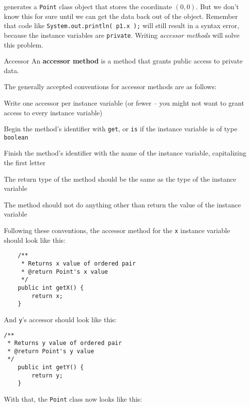 generates a \texttt{Point} class object that stores the coordinate $(0,0)$.  But we don't know this for sure until we can get the data back out of the object.  Remember that code like \texttt{System.out.println( p1.x );} will still result in a syntax error, because the instance variables are \texttt{private}.  Writing \textit{accessor methods} will solve this problem.

\begin{defn}{Accessor}
    An \textbf{accessor method} is a method that grants public access to private data.
\end{defn}

The generally accepted conventions for accessor methods are as follows:
\bi
\item Write one accessor per instance variable (or fewer -- you might not want to grant access to every instance variable)
\item Begin the method's identifier with \texttt{get}, or \texttt{is} if the instance variable is of type \texttt{boolean}
\item Finish the method's identifier with the name of the instance variable, capitalizing the first letter
\item The return type of the method should be the same as the type of the instance variable
\item The method should not do anything other than return the value of the instance variable
\ei

Following these conventions, the accessor method for the \texttt{x} instance variable should look like this:

\begin{verbatim}
    /**
     * Returns x value of ordered pair
     * @return Point's x value
     */
    public int getX() {
        return x;
    }
\end{verbatim}

And \texttt{y}'s accessor should look like this:

\begin{verbatim}
/**
 * Returns y value of ordered pair
 * @return Point's y value
 */
    public int getY() {
        return y;
    }
\end{verbatim}

With that, the \texttt{Point} class now looks like this:

